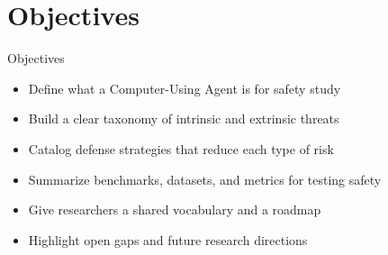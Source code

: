 \documentclass[10pt]{beamer}
\begin{document}
\section{Objectives}
\begin{frame}{Objectives}
\begin{itemize}
  \item Define what a Computer-Using Agent is for safety study
  \item Build a clear taxonomy of intrinsic and extrinsic threats
  \item Catalog defense strategies that reduce each type of risk
  \item Summarize benchmarks, datasets, and metrics for testing safety
  \item Give researchers a shared vocabulary and a roadmap
  \item Highlight open gaps and future research directions
\end{itemize}
\end{frame}
\end{document}
